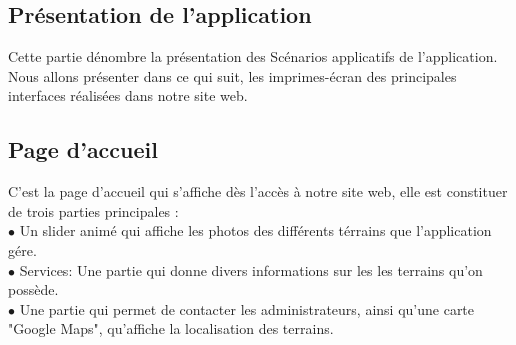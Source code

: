 \documentclass[a4paper]{report}
\begin{document}
\begin{spacing}{2}
\section{Présentation de l'application}
Cette partie dénombre la présentation des Scénarios applicatifs de l’application. Nous allons présenter dans ce qui suit, les imprimes-écran des principales interfaces réalisées dans notre site web.
\subsection{Page d'accueil}
C’est la page d’accueil qui s’affiche dès l’accès à notre site web, elle est constituer de trois parties principales :\\
$\bullet$ Un slider animé qui affiche les photos des différents térrains que l'application gére.\\
$\bullet$ Services: Une partie qui donne divers informations sur les les terrains qu'on possède.\\
$\bullet$ Une partie qui permet de contacter les administrateurs, ainsi qu'une carte "Google Maps", qu'affiche la localisation des terrains.\\ 
\begin{figure}[!ht]
\begin{center}

\end{center}
\end{figure}
\end{spacing}
\end{document}
